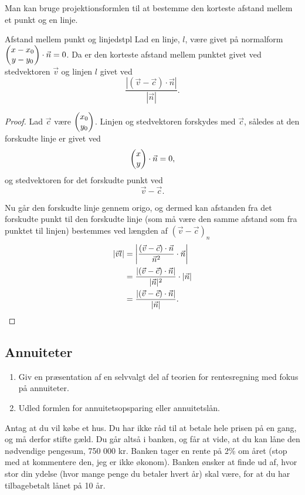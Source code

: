 \documentclass{article}
\begin{document}
Man kan bruge projektionsformlen til at bestemme den korteste afstand mellem et
punkt og en linje.

\smallskip

\begin{theorem}{Afstand mellem punkt og linje}{dstpl}
	Lad en linje, $l$, være givet på normalform $ \begin{pmatrix} x - x_0\\ y - y_0 \end{pmatrix} 
	\cdot \vec{n} = 0$. Da er den korteste afstand mellem punktet givet ved
	stedvektoren $\vec{v}$ og linjen $l$ givet ved
	\[
		\frac{|(\vec{v} - \vec{c}) \cdot \vec{n}|}{|\vec{n}|}.
	\] 
\end{theorem}

\begin{proof}
	Lad $\vec{c}$ være $ \begin{pmatrix} x_0\\ y_0 \end{pmatrix} $. Linjen og stedvektoren forskydes
	med $\vec{c}$, således at den forskudte linje er givet ved
	\[
		 \begin{pmatrix} x\\ y \end{pmatrix}  \cdot \vec{n} = 0,
	\] 
	og stedvektoren for det forskudte punkt ved
	\[
		\vec{v} - \vec{c}.
	\] 

	Nu går den forskudte linje gennem origo, og dermed kan afstanden fra det
	forskudte punkt til den forskudte linje (som må være den samme afstand som
	fra punktet til linjen) bestemmes ved længden af $(\vec{v} -
	\vec{c})_{n}$
	\begin{align*}
		|\vec{v}l| &= \left| \frac{(\vec{v} - \vec{c}) \cdot \vec{n}}{\vec{n}^2} \cdot \vec{n} \right|\\
				   &= \frac{|(\vec{v} - \vec{c}) \cdot \vec{n}|}{|\vec{n}|^2} \cdot |\vec{n}|\\
				   &= \frac{|(\vec{v} - \vec{c}) \cdot \vec{n}|}{|\vec{n}|}.\qedhere
	\end{align*}
\end{proof}

\begin{tcolorbox}
	\section{Annuiteter}
	\tcblower
	\begin{enumerate}
		\item Giv en præsentation af en selvvalgt del af teorien for
			rentesregning med fokus på annuiteter.
		\item Udled formlen for annuitetsopsparing eller annuitetslån.
	\end{enumerate}
\end{tcolorbox}

Antag at du vil købe et hus. Du har ikke råd til at betale hele prisen på en
gang, og må derfor stifte gæld. Du går altså i banken, og får at vide, at du
kan låne den nødvendige pengesum, 750 000 kr. Banken tager en rente på 2\% om
året (stop med at kommentere den, jeg er ikke økonom). Banken ønsker at finde
ud af, hvor stor din ydelse (hvor mange penge du betaler hvert år) skal være,
for at du har tilbagebetalt lånet på 10 år.
\end{document}
